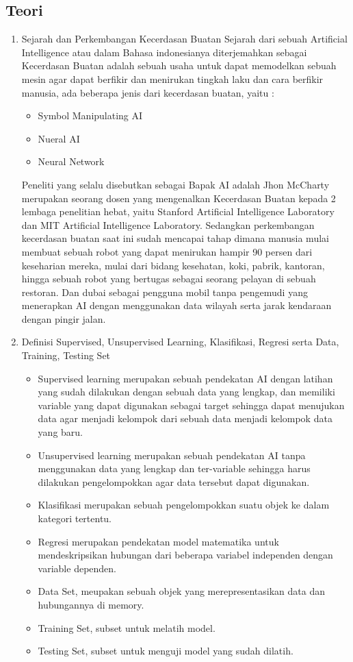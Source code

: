 \subsection{Teori}
\begin{enumerate}
\item
Sejarah dan Perkembangan Kecerdasan Buatan
\subitem
Sejarah dari sebuah Artificial Intelligence atau dalam Bahasa indonesianya diterjemahkan sebagai Kecerdasan Buatan adalah sebuah usaha untuk dapat memodelkan sebuah mesin agar dapat berfikir dan menirukan tingkah laku dan cara berfikir manusia, ada beberapa jenis dari kecerdasan buatan, yaitu :

\begin{itemize}
\item
Symbol Manipulating AI
\item
Nueral AI
\item
Neural Network
\end{itemize}
\subitem
Peneliti yang selalu disebutkan sebagai Bapak AI adalah Jhon McCharty  merupakan seorang dosen yang mengenalkan Kecerdasan Buatan kepada 2 lembaga penelitian hebat, yaitu Stanford Artificial Intelligence Laboratory dan MIT Artificial Intelligence Laboratory.
\subitem
Sedangkan perkembangan kecerdasan buatan saat ini sudah mencapai tahap dimana manusia mulai membuat sebuah robot yang dapat menirukan hampir 90 persen dari keseharian mereka, mulai dari bidang kesehatan, koki, pabrik, kantoran, hingga sebuah robot yang bertugas sebagai seorang pelayan di sebuah restoran. Dan dubai sebagai pengguna mobil tanpa pengemudi yang menerapkan AI dengan menggunakan data wilayah serta jarak kendaraan dengan pingir jalan.
\item
Definisi Supervised, Unsupervised Learning, Klasifikasi, Regresi serta Data, Training, Testing Set
\begin{itemize}
\item
Supervised learning merupakan sebuah pendekatan AI dengan latihan yang sudah dilakukan dengan sebuah data yang lengkap, dan memiliki variable yang dapat digunakan sebagai target sehingga dapat menujukan data agar menjadi kelompok dari sebuah data menjadi kelompok data yang baru.
\item
Unsupervised learning merupakan sebuah pendekatan AI tanpa menggunakan data yang lengkap dan ter-variable sehingga harus dilakukan pengelompokkan agar data tersebut dapat digunakan.
\item
Klasifikasi merupakan sebuah pengelompokkan suatu objek ke dalam kategori tertentu.
\item
Regresi merupakan pendekatan model matematika untuk mendeskripsikan hubungan dari beberapa variabel independen dengan variable dependen.
\item
Data Set, meupakan sebuah objek yang merepresentasikan data dan hubungannya di memory. 
\item
Training Set, subset untuk melatih model.
\item
Testing Set, subset untuk menguji model yang sudah dilatih.
\end{itemize}



\end{enumerate}
